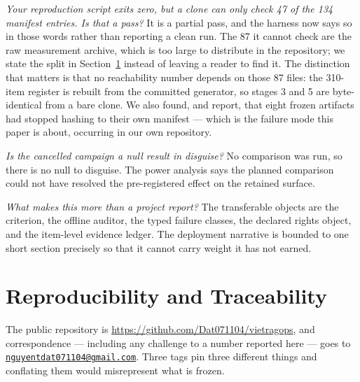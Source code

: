 \documentclass[11pt]{article}
\begin{document}
\emph{Your reproduction script exits zero, but a clone can only check 47 of the
134 manifest entries. Is that a pass?} It is a partial pass, and the harness
now says so in those words rather than reporting a clean run. The 87 it cannot
check are the raw measurement archive, which is too large to distribute in the
repository; we state the split in Section~\ref{sec:repro} instead of leaving a
reader to find it. The distinction that matters is that no reachability number
depends on those 87 files: the 310-item register is rebuilt from the committed
generator, so stages 3 and 5 are byte-identical from a bare clone. We also
found, and report, that eight frozen artifacts had stopped hashing to their own
manifest --- which is the failure mode this paper is about, occurring in our
own repository.

\emph{Is the cancelled campaign a null result in disguise?} No comparison was
run, so there is no null to disguise. The power analysis says the planned
comparison could not have resolved the pre-registered effect on the retained
surface.

\emph{What makes this more than a project report?} The transferable objects
are the criterion, the offline auditor, the typed failure classes, the
declared rights object, and the item-level evidence ledger. The deployment
narrative is bounded to one short section precisely so that it cannot carry
weight it has not earned.

\section{Reproducibility and Traceability}
\label{sec:repro}

The public repository is \url{https://github.com/Dat071104/vietragops}, and
correspondence --- including any challenge to a number reported here --- goes
to \href{mailto:nguyentdat071104@gmail.com}{\nolinkurl{nguyentdat071104@gmail.com}}.
Three tags pin three different things and conflating them would misrepresent
what is frozen.
\end{document}
